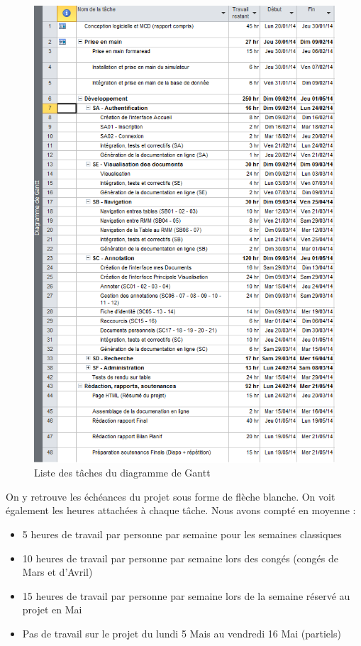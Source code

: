 \documentclass[a4paper]{article}
\begin{document}
\begin{figure}[H]
\centering
\includegraphics[width=\textwidth]{taches_gantt.png}
\caption{Liste des tâches du diagramme de Gantt}
\label{fig:taches_gantt}
\end{figure}

\newpage

	On y retrouve les échéances du projet sous forme de flèche blanche. On voit également les heures attachées à chaque tâche. Nous avons compté en moyenne : 
	
\begin{itemize}
\item 5 heures de travail par personne par semaine pour les semaines classiques
\item 10 heures de travail par personne par semaine lors des congés (congés de Mars et d'Avril)
\item 15 heures de travail par personne par semaine lors de la semaine réservé au projet en Mai
\item Pas de travail sur le projet du lundi 5 Mais au vendredi 16 Mai (partiels)
\end{itemize}
\end{document}
